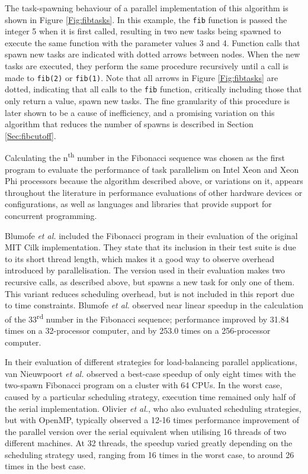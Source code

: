 \documentclass{report}
\begin{document}
The task-spawning behaviour of a parallel implementation of this algorithm is shown in Figure \ref{Fig:fibtasks}. In this example, the \verb!fib! function is passed the integer 5 when it is first called, resulting in two new tasks being spawned to execute the same function with the parameter values 3 and 4. Function calls that spawn new tasks are indicated with dotted arrows between nodes. When the new tasks are executed, they perform the same procedure recursively until a call is made to \verb!fib(2)! or \verb!fib(1)!. Note that all arrows in Figure \ref{Fig:fibtasks} are dotted, indicating that all calls to the \verb!fib! function, critically including those that only return a value, spawn new tasks. The fine granularity of this procedure is later shown to be a cause of inefficiency, and a promising variation on this algorithm that reduces the number of spawns is described in Section \ref{Sec:fibcutoff}.

Calculating the n\textsuperscript{th} number in the Fibonacci sequence was chosen as the first program to evaluate the performance of task parallelism on Intel Xeon and Xeon Phi processors because the algorithm described above, or variations on it, appears throughout the literature in performance evaluations of other hardware devices or configurations, as well as languages and libraries that provide support for concurrent programming.

Blumofe \textit{et al.}\cite{Blumofe95} included the Fibonacci program in their evaluation of the original MIT Cilk implementation. They state that its inclusion in their test suite is due to its short thread length, which makes it a good way to observe overhead introduced by parallelisation. The version used in their evaluation makes two recursive calls, as described above, but spawns a new task for only one of them. This variant reduces scheduling overhead, but is not included in this report due to time constraints. Blumofe \textit{et al.} observed near linear speedup in the calculation of the 33\textsuperscript{rd} number in the Fibonacci sequence; performance improved by 31.84 times on a 32-processor computer, and by 253.0 times on a 256-processor computer. 

In their evaluation of different strategies for load-balancing parallel applications, van Nieuwpoort \textit{et al.}\cite{Nieuwpoort01} observed a best-case speedup of only eight times with the two-spawn Fibonacci program on a cluster with 64 CPUs. In the worst case, caused by a particular scheduling strategy, execution time remained only half of the serial implementation. Olivier \textit{et al.}\cite{Olivier12}, who also evaluated scheduling strategies, but with OpenMP, typically observed a 12-16 times performance improvement of the parallel version over the serial equivalent when utilising 16 threads of two different machines. At 32 threads, the speedup varied greatly depending on the scheduling strategy used, ranging from 16 times in the worst case, to around 26 times in the best case.
\end{document}
